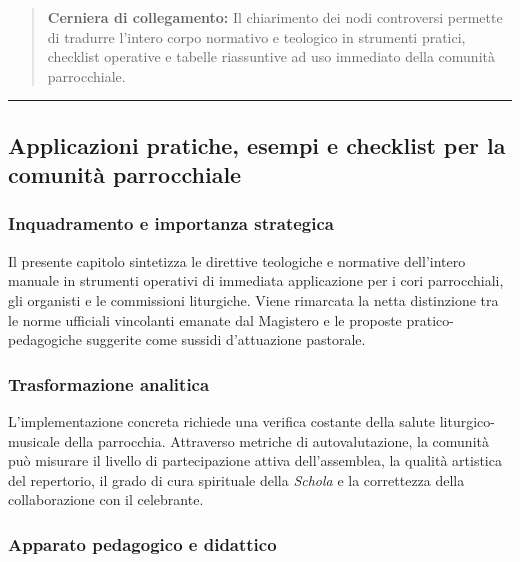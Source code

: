 \documentclass[12pt,a4paper]{article}
\begin{document}
	\begin{quote}
		\textbf{Cerniera di collegamento:} Il chiarimento dei nodi controversi permette di tradurre l'intero corpo normativo e teologico in strumenti pratici, checklist operative e tabelle riassuntive ad uso immediato della comunità parrocchiale.
	\end{quote}
	
	\begin{center}\rule{0.5\linewidth}{0.5pt}\end{center}
	
	\subsection{Applicazioni pratiche, esempi e checklist per la comunità parrocchiale}\label{applicazioni-pratiche-esempi-e-checklist-per-la-comunita-parrocchiale}
	
	\subsubsection{Inquadramento e importanza strategica}\label{inquadramento-e-importanza-strategica-15}
	
	Il presente capitolo sintetizza le direttive teologiche e normative dell'intero manuale in strumenti operativi di immediata applicazione per i cori parrocchiali, gli organisti e le commissioni liturgiche. Viene rimarcata la netta distinzione tra le norme ufficiali vincolanti emanate dal Magistero e le proposte pratico-pedagogiche suggerite come sussidi d'attuazione pastorale.
	
	\subsubsection{Trasformazione analitica}\label{trasformazione-analitica-16}
	
	L'implementazione concreta richiede una verifica costante della salute liturgico-musicale della parrocchia. Attraverso metriche di autovalutazione, la comunità può misurare il livello di partecipazione attiva dell'assemblea, la qualità artistica del repertorio, il grado di cura spirituale della \emph{Schola} e la correttezza della collaborazione con il celebrante.
	
	\subsubsection{Apparato pedagogico e didattico}\label{apparato-pedagogico-e-didattico-16}
	
\end{document}
